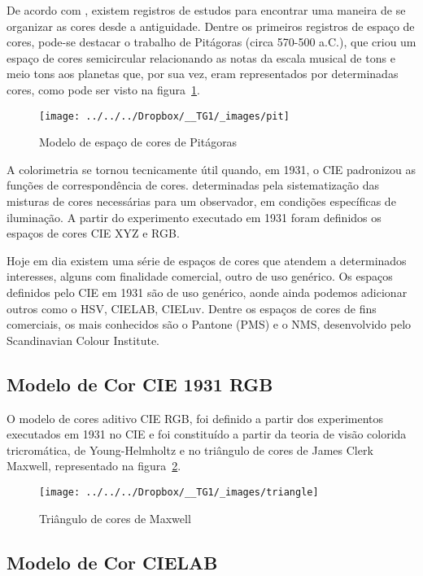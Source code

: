 \documentclass[ecp,tc]{iiufrgs}
\begin{document}
De acordo com , existem registros de estudos para encontrar uma maneira de se organizar as cores desde a antiguidade. Dentre os primeiros registros de espaço de cores, pode-se destacar  o trabalho de Pitágoras (circa 570-500 a.C.), que criou um espaço de cores semicircular relacionando as notas da escala musical de tons e meio tons aos planetas que, por sua vez, eram representados por determinadas cores, como pode ser visto na figura~\ref{fig:pit}.

\begin{figure}
	\centering
	\caption{Modelo de espaço de cores de Pitágoras}
	\texttt{[image: ../../../Dropbox/\_\_TG1/\_images/pit]}
	\label{fig:pit}
\end{figure}

A colorimetria se tornou tecnicamente útil quando, em 1931, o CIE padronizou as funções de correspondência de cores. determinadas pela sistematização das misturas de cores necessárias para um observador, em condições específicas de iluminação. A partir do experimento executado em 1931 foram definidos os espaços de cores CIE XYZ e RGB.

Hoje em dia existem uma série de espaços de cores que atendem a determinados interesses, alguns com finalidade comercial, outro de uso genérico. Os espaços definidos pelo CIE em 1931 são de uso genérico, aonde ainda podemos adicionar outros como o HSV, CIELAB, CIELuv. Dentre os espaços de cores de fins comerciais, os mais conhecidos são o Pantone (PMS) e o NMS, desenvolvido pelo Scandinavian Colour Institute.

\subsection{Modelo de Cor CIE 1931 RGB}

O modelo de cores aditivo CIE RGB, foi definido a partir dos experimentos executados em 1931 no CIE e foi constituído a partir da teoria de visão colorida tricromática, de Young-Helmholtz e no triângulo de cores de James Clerk Maxwell, representado na figura~\ref{fig:triangle}. 

\begin{figure}
	\centering
	\caption{Triângulo de cores de Maxwell}
	\texttt{[image: ../../../Dropbox/\_\_TG1/\_images/triangle]}
	\label{fig:triangle}
\end{figure}

\subsection{Modelo de Cor CIELAB}
\end{document}
